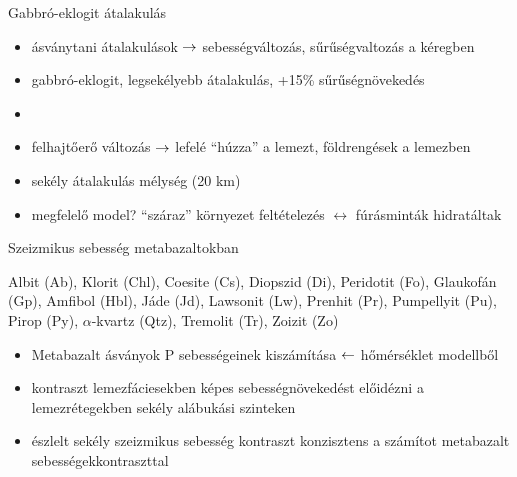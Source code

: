 \documentclass{beamer}
\begin{document}
\begin{frame}{Gabbró-eklogit átalakulás}
    \begin{itemize}
        \item ásványtani átalakulások $\rightarrow$ sebességváltozás, sűrűségvaltozás a kéregben
        \item gabbró-eklogit, legsekélyebb átalakulás, +15\% sűrűségnövekedés
        \item {}
        \item felhajtőerő változás $\rightarrow$ lefelé ``húzza'' a lemezt, földrengések a lemezben
        \item sekély átalakulás mélység (20 km)
        \item megfelelő model? ``száraz'' környezet feltételezés $\leftrightarrow$ fúrásminták hidratáltak
    \end{itemize}
\end{frame}


\begin{frame}{Szeizmikus sebesség metabazaltokban}
    \begin{minipage}[c]{0.45\textwidth}
        \centering
        
        {\small
        Albit (Ab), Klorit (Chl), Coesite (Cs), Diopszid (Di), Peridotit (Fo), Glaukofán (Gp), Amfibol (Hbl), Jáde (Jd), Lawsonit (Lw), Prenhit (Pr), Pumpellyit (Pu), Pirop (Py), $\alpha$-kvartz (Qtz), Tremolit (Tr), Zoizit (Zo)
        }
    \end{minipage}
    \hspace{10pt}
    \begin{minipage}[c]{0.5\textwidth}
        \begin{itemize}
            \item Metabazalt ásványok P sebességeinek kiszámítása $\leftarrow$ hőmérséklet modellből
            \item kontraszt lemezfáciesekben képes sebességnövekedést előidézni a lemezrétegekben sekély alábukási szinteken
            \item észlelt sekély szeizmikus sebesség kontraszt konzisztens a számítot metabazalt sebességekkontraszttal
        \end{itemize}        
    \end{minipage}    
\end{frame}


\end{document}
